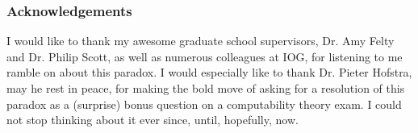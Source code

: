 \documentclass[runningheads]{llncs}
\begin{document}
%
%


\subsubsection*{Acknowledgements}

I would like to thank my awesome graduate school supervisors, Dr. Amy Felty
and Dr. Philip Scott, as well as numerous colleagues at IOG,
for listening to me ramble on about this paradox.
I would especially like to thank Dr. Pieter Hofstra, may he rest in peace,
for making the bold move of asking for a resolution
of this paradox as a (surprise) bonus question on a computability theory exam.
I could not stop thinking about it ever since, until, hopefully, now.


%



\end{document}

